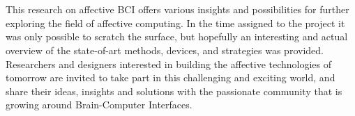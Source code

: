 \\
\\
This research on affective \ac{BCI} offers various insights and possibilities for further exploring the field of affective computing. In the time assigned to the project it was only possible to scratch the surface, but hopefully an interesting and actual overview of the state-of-art methods, devices, and strategies was provided. Researchers and designers interested in building the affective technologies of tomorrow are invited to take part in this challenging and exciting world, and share their ideas, insights and solutions with the passionate community that is growing around Brain-Computer Interfaces.
